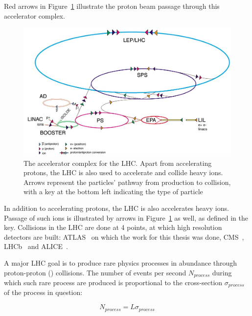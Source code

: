 \par Red arrows in Figure~\ref{fig:lhc} illustrate the proton beam passage through
this accelerator complex.  

\begin{figure}[!h]
	\centering
   \includegraphics[width=\textwidth]{figures/lhc-pho-1991-001.jpg}
	\caption{The accelerator complex for the LHC. Apart from accelerating protons, the LHC 
					is also used to accelerate and collide heavy ions. Arrows represent the particles' 
					pathway from production to collision, with a key at the bottom left indicating 
					the type of particle}
	\label{fig:lhc}
\end{figure}

\par In addition to accelerating protons, the LHC is also accelerates heavy 
ions. Passage of such ions is illustrated by arrows in Figure~\ref{fig:lhc} as well, as defined 
in the key. Collisions in the LHC are done at 4 points, at which high resolution detectors are built:
ATLAS~\cite{1748-0221-3-08-S08003} on which the work for this thesis was done, 
CMS~\cite{Chatrchyan:2008aa}, LHCb~\cite{Amato:1998xt} and ALICE~\cite{1748-0221-3-08-S08002}.


\par A major LHC goal is to produce rare physics processes in abundance through proton-proton (\pp) 
collisions. The number of events per second $N_{process}$ during which such rare process are produced  
is proportional to the cross-section $\sigma_{process}$ of the process in question: 

\begin{equation}
N_{process} = L\sigma_{process}
\label{eq:lumi}
\end{equation}

